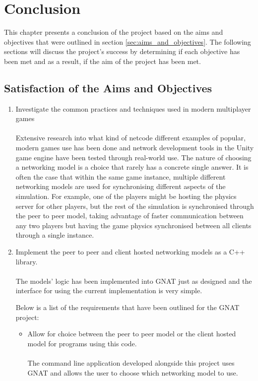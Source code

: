 

\chapter{Conclusion}
This chapter presents a conclusion of the project based on the aims and objectives that were outlined in section \ref{sec:aims_and_objectives}. The following sections will discuss the project's success by determining if each objective has been met and as a result, if the aim of the project has been met.

\section{Satisfaction of the Aims and Objectives}
\begin{enumerate}
\item Investigate the common practices and techniques used in modern multiplayer games
  \\\\
  Extensive research into what kind of netcode different examples of popular, modern games use has been done and network development tools in the Unity game engine have been tested through real-world use. The nature of choosing a networking model is a choice that rarely has a concrete single answer. It is often the case that within the same game instance, multiple different networking models are used for synchronising different aspects of the simulation. For example, one of the players might be hosting the physics server for other players, but the rest of the simulation is synchronised through the peer to peer model, taking advantage of faster communication between any two players but having the game physics synchronised between all clients through a single instance.


\item Implement the peer to peer and client hosted networking models as a C++ library.
  \\\\
  The models' logic has been implemented into GNAT just as designed and the interface for using the current implementation is very simple.

  Below is a list of the requirements that have been outlined for the GNAT project:

  \begin{itemize}
  \item Allow for choice between the peer to peer model or the client hosted model for programs using this code.
    \\\\
    The command line application developed alongside this project uses GNAT and allows the user to choose which networking model to use.



\end{itemize}
\end{enumerate}
